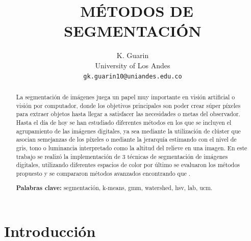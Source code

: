 \documentclass[10pt,twocolumn,letterpaper]{article}
\begin{document}
\title{\ MÉTODOS DE SEGMENTACIÓN}

\author{K. Guarin \\
University of Los Andes\\
{\tt\small gk.guarin10@uniandes.edu.co}
}
\maketitle
\begin{abstract}
 La segmentación de imágenes juega un papel muy importante en visión artificial o visión por computador, donde los objetivos principales son poder crear súper píxeles para extraer objetos hasta llegar a satisfacer las necesidades o metas del observador.
 Hasta el día de hoy se han estudiado diferentes métodos en los que se incluyen el agrupamiento de las imágenes digitales, ya sea mediante la utilización de clúster que asocian semejanzas de los píxeles o mediante la jerarquía estimando con el nivel de gris,
 tono o luminancia interpretado como la altitud del relieve en una imagen. En este trabajo se realizó la implementación de 3 técnicas de segmentación de imágenes digitales, utilizando diferentes espacios de color por último se evaluaron los métodos propuesto
 y se compararon métodos avanzados encontrando que .

   {\bf Palabras clave:} segmentación, k-means, gmm, watershed, hsv, lab, ucm.
   
   \end{abstract}

\section{Introducción}
\end{document}
